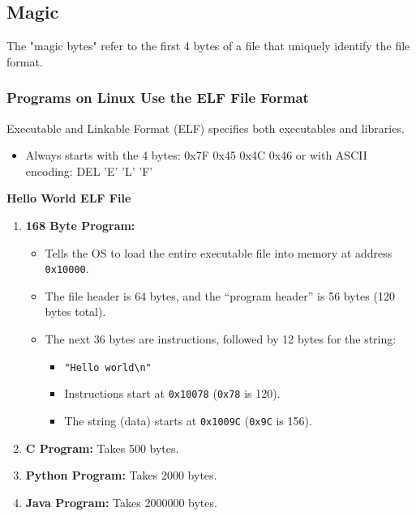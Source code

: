 \subsection{Magic}
\begin{definition}
    The "magic bytes" refer to the first 4 bytes of a file that uniquely identify the file format. 
\end{definition}

\subsubsection{Programs on Linux Use the ELF File Format}
\begin{definition}
    Executable and Linkable Format (ELF) specifies both executables and libraries.
    \begin{itemize}
        \item Always starts with the 4 bytes: 0x7F 0x45 0x4C 0x46 or with ASCII encoding: DEL 'E' 'L' 'F'
    \end{itemize}
\end{definition}

\begin{example} \textbf{Hello World ELF File}
    \begin{enumerate}
        \item \textbf{168 Byte Program:}
        \begin{itemize}
            \item Tells the OS to load the entire executable file into memory at address \texttt{0x10000}.
            \item The file header is 64 bytes, and the ``program header'' is 56 bytes (120 bytes total).
            \item The next 36 bytes are instructions, followed by 12 bytes for the string:
                \begin{itemize}
                    \item \texttt{"Hello world\textbackslash n"}
                    \item Instructions start at \texttt{0x10078} (\texttt{0x78} is 120).
                    \item The string (data) starts at \texttt{0x1009C} (\texttt{0x9C} is 156).
                \end{itemize}
        \end{itemize} 
        \item \textbf{C Program:} Takes 500 bytes.
        \item \textbf{Python Program:} Takes 2000 bytes.
        \item \textbf{Java Program:} Takes 2000000 bytes.
    \end{enumerate}
\end{example}

